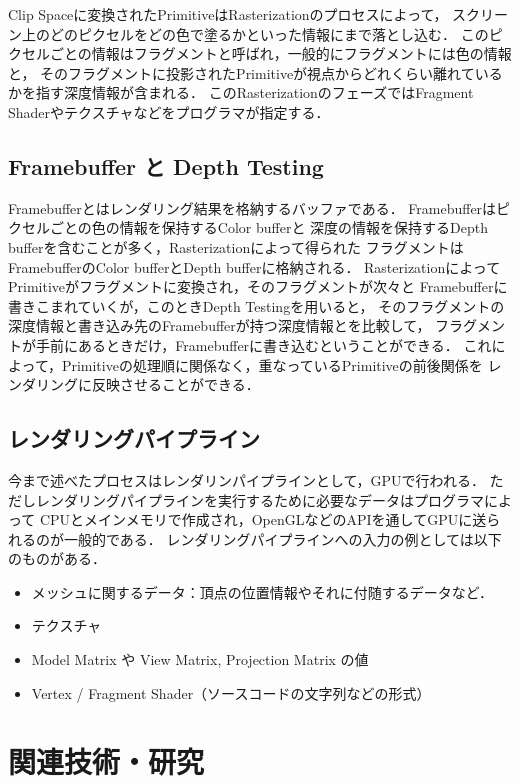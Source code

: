 Clip Spaceに変換されたPrimitiveはRasterizationのプロセスによって，
スクリーン上のどのピクセルをどの色で塗るかといった情報にまで落とし込む．
このピクセルごとの情報はフラグメントと呼ばれ，一般的にフラグメントには色の情報と，
そのフラグメントに投影されたPrimitiveが視点からどれくらい離れているかを指す深度情報が含まれる．
このRasterizationのフェーズではFragment Shaderやテクスチャなどをプログラマが指定する．

\subsection*{Framebuffer と Depth Testing}

Framebufferとはレンダリング結果を格納するバッファである．
Framebufferはピクセルごとの色の情報を保持するColor bufferと
深度の情報を保持するDepth bufferを含むことが多く，Rasterizationによって得られた
フラグメントはFramebufferのColor bufferとDepth bufferに格納される．
RasterizationによってPrimitiveがフラグメントに変換され，そのフラグメントが次々と
Framebufferに書きこまれていくが，このときDepth Testingを用いると，
そのフラグメントの深度情報と書き込み先のFramebufferが持つ深度情報とを比較して，
フラグメントが手前にあるときだけ，Framebufferに書き込むということができる．
これによって，Primitiveの処理順に関係なく，重なっているPrimitiveの前後関係を
レンダリングに反映させることができる．

\subsection*{レンダリングパイプライン}

今まで述べたプロセスはレンダリンパイプラインとして，GPUで行われる．
ただしレンダリングパイプラインを実行するために必要なデータはプログラマによって
CPUとメインメモリで作成され，OpenGLなどのAPIを通してGPUに送られるのが一般的である．
レンダリングパイプラインへの入力の例としては以下のものがある．

\begin{itemize}
  \item メッシュに関するデータ：頂点の位置情報やそれに付随するデータなど．
  \item テクスチャ
  \item Model Matrix や View Matrix, Projection Matrix の値
  \item Vertex / Fragment Shader（ソースコードの文字列などの形式）
\end{itemize}

\section{関連技術・研究}

